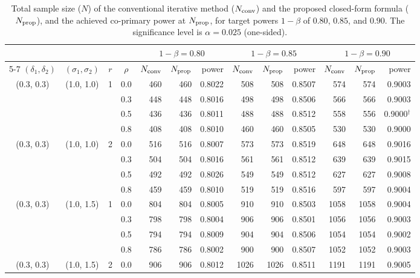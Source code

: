 \begin{table}[ht]
\centering
\footnotesize
\setlength{\tabcolsep}{4pt}
\caption{Total sample size ($N$) of the conventional iterative method ($N_{\rm conv}$) and the proposed closed-form formula ($N_{\rm prop}$), and the achieved co-primary power at $N_{\rm prop}$, for target powers $1 - \beta$ of $0.80$, $0.85$, and $0.90$. The significance level is $\alpha = 0.025$ (one-sided).}
\label{tab:ss_comparison}
\begin{threeparttable}
\begin{tabular}{ccccrrrrrrrrr}
\hline
 & & & & \multicolumn{3}{c}{$1 - \beta = 0.80$} & \multicolumn{3}{c}{$1 - \beta = 0.85$} & \multicolumn{3}{c}{$1 - \beta = 0.90$} \\
\cline{5-7} \cline{8-10} \cline{11-13}
$(\delta_1, \delta_2)$ & $(\sigma_1, \sigma_2)$ & $r$ & $\rho$ & $N_{\rm conv}$ & $N_{\rm prop}$ & power & $N_{\rm conv}$ & $N_{\rm prop}$ & power & $N_{\rm conv}$ & $N_{\rm prop}$ & power \\
\hline
(0.3, 0.3) & (1.0, 1.0) & 1 & 0.0 & 460 & 460 & 0.8022 & 508 & 508 & 0.8507 & 574 & 574 & 0.9003 \\
 &  &  & 0.3 & 448 & 448 & 0.8016 & 498 & 498 & 0.8506 & 566 & 566 & 0.9003 \\
 &  &  & 0.5 & 436 & 436 & 0.8011 & 488 & 488 & 0.8512 & 558 & 556 & 0.9000$^{\dagger}$ \\
 &  &  & 0.8 & 408 & 408 & 0.8010 & 460 & 460 & 0.8505 & 530 & 530 & 0.9000 \\
(0.3, 0.3) & (1.0, 1.0) & 2 & 0.0 & 516 & 516 & 0.8007 & 573 & 573 & 0.8519 & 648 & 648 & 0.9016 \\
 &  &  & 0.3 & 504 & 504 & 0.8016 & 561 & 561 & 0.8512 & 639 & 639 & 0.9015 \\
 &  &  & 0.5 & 492 & 492 & 0.8026 & 549 & 549 & 0.8512 & 627 & 627 & 0.9008 \\
 &  &  & 0.8 & 459 & 459 & 0.8010 & 519 & 519 & 0.8516 & 597 & 597 & 0.9004 \\
(0.3, 0.3) & (1.0, 1.5) & 1 & 0.0 & 804 & 804 & 0.8005 & 910 & 910 & 0.8503 & 1058 & 1058 & 0.9004 \\
 &  &  & 0.3 & 798 & 798 & 0.8004 & 906 & 906 & 0.8501 & 1056 & 1056 & 0.9003 \\
 &  &  & 0.5 & 794 & 794 & 0.8009 & 904 & 904 & 0.8506 & 1054 & 1054 & 0.9002 \\
 &  &  & 0.8 & 786 & 786 & 0.8002 & 900 & 900 & 0.8507 & 1052 & 1052 & 0.9003 \\
(0.3, 0.3) & (1.0, 1.5) & 2 & 0.0 & 906 & 906 & 0.8012 & 1026 & 1026 & 0.8511 & 1191 & 1191 & 0.9005 \\

\end{tabular}
\end{threeparttable}
\end{table}
